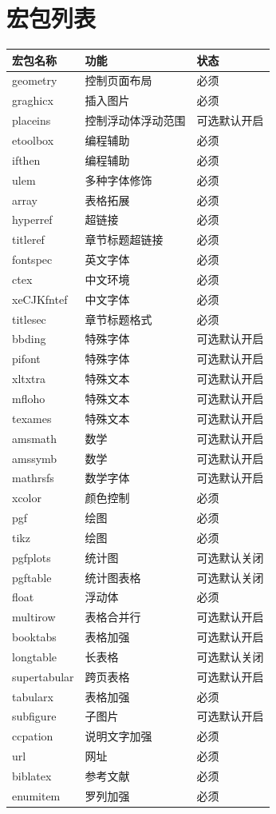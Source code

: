 \documentclass[twoside,maketable]{cauthesis}
\begin{document}
\section{宏包列表}
	\begin{center}
		\begin{supertabular}{lll}
			\hline
			宏包名称&功能&状态\\
			\hline
			geometry&控制页面布局&必须\\
			graghicx&插入图片&必须\\
			placeins&控制浮动体浮动范围&可选默认开启\\
			etoolbox&编程辅助&必须\\
			ifthen&编程辅助&必须\\
			ulem&多种字体修饰&必须\\
			array&表格拓展&必须\\
			\hline
			hyperref&超链接&必须\\
			titleref&章节标题超链接&必须\\
			fontspec&英文字体&必须\\
			ctex&中文环境&必须\\
			xeCJKfntef&中文字体&必须\\
			titlesec&章节标题格式&必须\\
			\hline
			bbding&特殊字体&可选默认开启\\
			pifont&特殊字体&可选默认开启\\
			xltxtra&特殊文本&可选默认开启\\
			mfloho&特殊文本&可选默认开启\\
			texames&特殊文本&可选默认开启\\
			\hline
			amsmath&数学&可选默认开启\\
			amssymb&数学&可选默认开启\\
			mathrsfs&数学字体&可选默认开启\\
			\hline
			xcolor&颜色控制&必须\\
			pgf&绘图&必须\\
			tikz&绘图&必须\\
			pgfplots&统计图&可选默认关闭\\
			pgftable&统计图表格&可选默认关闭\\
			\hline
			float&浮动体&必须\\
			multirow&表格合并行&可选默认开启\\
			booktabs&表格加强&可选默认开启\\
			longtable&长表格&可选默认关闭\\
			supertabular&跨页表格&可选默认开启\\
			tabularx&表格加强&必须\\
			subfigure&子图片&可选默认开启\\
			\hline
			ccpation&说明文字加强&必须\\
			url&网址&必须\\
			biblatex&参考文献&必须\\
			enumitem&罗列加强&必须\\
			\hline
		\end{supertabular}
	\end{center}
\end{document}
